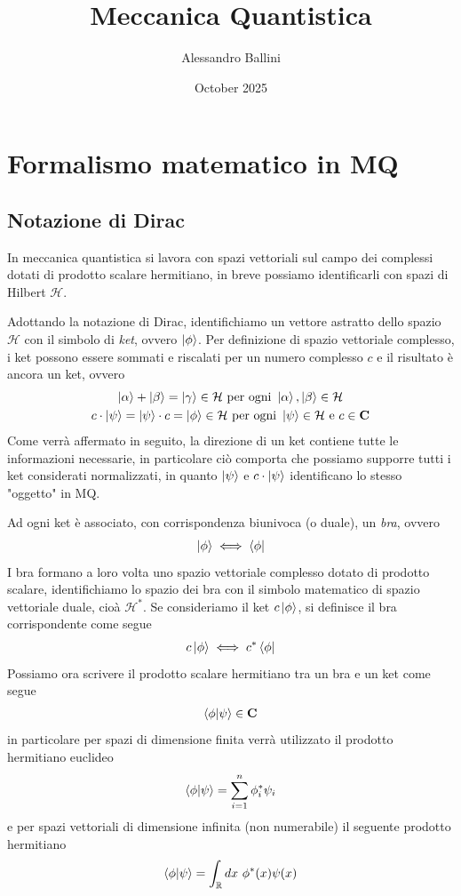 \documentclass{article}
\title{Meccanica Quantistica}
\author{Alessandro Ballini}
\date{October 2025}
\begin{document}
\maketitle

\tableofcontents
\newpage

\section{Formalismo matematico in MQ}
\subsection{Notazione di Dirac}
In meccanica quantistica si lavora con spazi vettoriali sul campo dei complessi dotati di prodotto scalare hermitiano, in breve possiamo identificarli con spazi di Hilbert $\mathcal{H}$.

Adottando la notazione di Dirac, identifichiamo un vettore astratto dello spazio $\mathcal{H}$ con il simbolo di \textit{ket}, ovvero $\ket{\phi}$. Per definizione di spazio vettoriale complesso, i ket possono essere sommati e riscalati per un numero complesso $c$ e il risultato è ancora un ket, ovvero
\begin{gather}
    \ket{\alpha} + \ket{\beta} = \ket{\gamma} \in \mathcal{H} \text{ per ogni } \ket{\alpha}, \ket{\beta} \in \mathcal{H} \notag \\
    c \cdot \ket{\psi} = \ket{\psi} \cdot c = \ket{\phi} \in \mathcal{H} \text{ per ogni } \ket{\psi} \in \mathcal{H} \text{ e } c \in \mathbf{C} \notag
\end{gather}
Come verrà affermato in seguito, la direzione di un ket contiene tutte le informazioni necessarie, in particolare ciò comporta che possiamo supporre tutti i ket considerati normalizzati, in quanto $\ket{\psi}$ e $c \cdot \ket{\psi}$ identificano lo stesso "oggetto" in MQ.

Ad ogni ket è associato, con corrispondenza biunivoca (o duale), un \textit{bra}, ovvero
\begin{gather}
    \ket{\phi} \iff \bra{\phi} \notag
\end{gather}
I bra formano a loro volta uno spazio vettoriale complesso dotato di prodotto scalare, identifichiamo lo spazio dei bra con il simbolo matematico di spazio vettoriale duale, cioà $\mathcal{H}^*$. Se consideriamo il ket $c \ket{\phi}$, si definisce il bra corrispondente come segue
\begin{gather}
    c \ket{\phi} \iff c^* \bra{\phi} \notag
\end{gather}
Possiamo ora scrivere il prodotto scalare hermitiano tra un bra e un ket come segue
\begin{gather}
    \braket{\phi|\psi} \in \mathbf{C} \notag
\end{gather}
in particolare per spazi di dimensione finita verrà utilizzato il prodotto hermitiano euclideo
\begin{gather}
    \braket{\phi|\psi} = \sum_{i = 1}^n \phi_i^*\psi_i \notag
\end{gather}
e per spazi vettoriali di dimensione infinita (non numerabile) il seguente prodotto hermitiano
\begin{gather}
    \braket{\phi|\psi} = \int_{\mathbb{R}} dx \ \phi^*(x)\psi(x) \notag
\end{gather}
\end{document}
